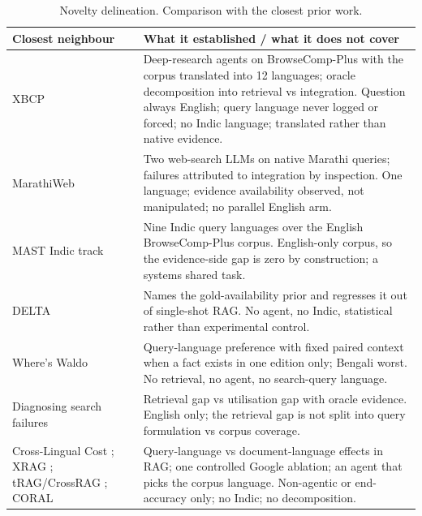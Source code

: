 \begin{table}[h]
\small
\centering
\begin{tabular}{p{3.6cm}p{9.6cm}}
\toprule
\textbf{Closest neighbour} & \textbf{What it established / what it does not cover} \\
\midrule
XBCP \citep{a2606_15345} & Deep-research agents on BrowseComp-Plus with the corpus translated into 12 languages; oracle decomposition into retrieval vs integration. Question always English; query language never logged or forced; no Indic language; translated rather than native evidence. \\
MarathiWeb \citep{kale2026marathiweb} & Two web-search LLMs on native Marathi queries; failures attributed to integration by inspection. One language; evidence availability observed, not manipulated; no parallel English arm. \\
MAST Indic track \citep{mast2026} & Nine Indic query languages over the English BrowseComp-Plus corpus. English-only corpus, so the evidence-side gap is zero by construction; a systems shared task. \\
DELTA \citep{a2601_02956} & Names the gold-availability prior and regresses it out of single-shot RAG. No agent, no Indic, statistical rather than experimental control. \\
Where's Waldo \citep{a2610_00606} & Query-language preference with fixed paired context when a fact exists in one edition only; Bengali worst. No retrieval, no agent, no search-query language. \\
Diagnosing search failures \citep{a2608_01913} & Retrieval gap vs utilisation gap with oracle evidence. English only; the retrieval gap is not split into query formulation vs corpus coverage. \\
Cross-Lingual Cost \citep{a2507_07543}; XRAG \citep{a2505_10089}; tRAG/CrossRAG \citep{a2504_03616}; CORAL \citep{a2604_25676} & Query-language vs document-language effects in RAG; one controlled Google ablation; an agent that picks the corpus language. Non-agentic or end-accuracy only; no Indic; no decomposition. \\
\bottomrule
\end{tabular}
\caption{Novelty delineation. Comparison with the closest prior work.}
\label{tab:delineation}
\end{table}
